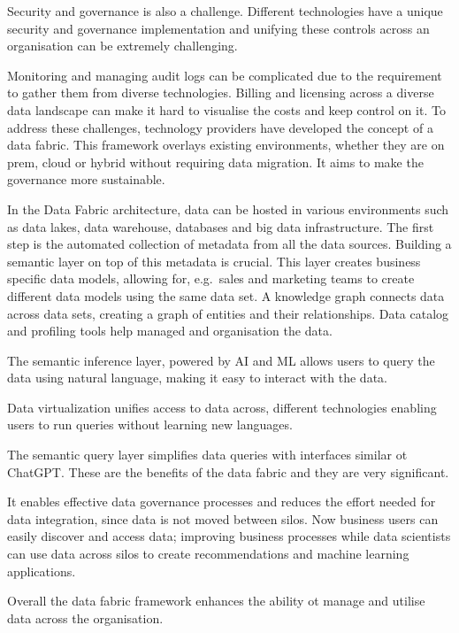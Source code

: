 \documentclass[a4paper, 11pt]{article}
\begin{document}
    Security and governance is also a challenge.
    Different technologies have a unique security and governance implementation and unifying these controls across an organisation can be extremely challenging.

    Monitoring and managing audit logs can be complicated due to the requirement to gather them from diverse technologies.
    Billing and licensing across a diverse data landscape can make it hard to visualise the costs and keep control on it.
    To address these challenges, technology providers have developed the concept of a data fabric.
    This framework overlays existing environments, whether they are on prem, cloud or hybrid without requiring data migration.
    It aims to make the governance more sustainable.

    In the Data Fabric architecture, data can be hosted in various environments such as data lakes, data warehouse, databases and big data infrastructure.
    The first step is the automated collection of metadata from all the data sources.
    Building a semantic layer on top of this metadata is crucial.
    This layer creates business specific data models, allowing for, e.g.\ sales and marketing teams to create different data models using the same data set.
    A knowledge graph connects data across data sets, creating a graph of entities and their relationships.
    Data catalog and profiling tools help managed and organisation the data.

    The semantic inference layer, powered by AI and ML allows users to query the data using natural language, making it easy to interact with the data.

    Data virtualization unifies access to data across, different technologies enabling users to run queries without learning new languages.

    The semantic query layer simplifies data queries with interfaces similar ot ChatGPT\@.
    These are the benefits of the data fabric and they are very significant.

    It enables effective data governance processes and reduces the effort needed for data integration, since data is not moved between silos.
    Now business users can easily discover and access data; improving business processes while data scientists can use data across silos to create recommendations and machine learning applications.

    Overall the data fabric framework enhances the ability ot manage and utilise data across the organisation.
\end{document}
